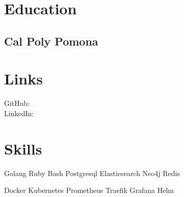 \documentclass[]{modern}
\begin{document}
%
%

%
%



%
%

\begin{minipage}[t]{0.33\textwidth}


\section{Education}

\subsection{Cal Poly Pomona}
\sectionsep


\section{Links}
GitHub: \href{https://github.com/kylegrantlucas}{} \\
LinkedIn: \href{https://www.linkedin.com/in/kylegrantlucas}{} \\
\sectionsep


\section{Skills}
Golang \textbullet{} Ruby \textbullet{} Bash \textbullet{} Postgresql \textbullet{} Elasticsearch \textbullet{} Neo4j \textbullet{} Redis

Docker \textbullet{} Kubernetes \textbullet{} Prometheus \textbullet{} Traefik \textbullet{} Grafana \textbullet{} Helm


\end{minipage}
\end{document}
